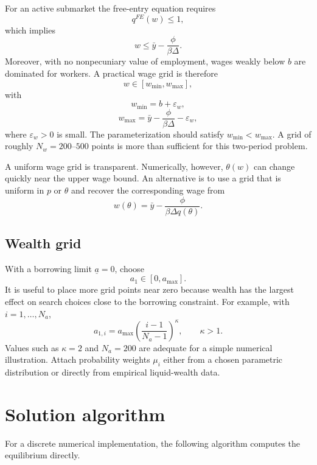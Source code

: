 \documentclass[11pt]{article}
\newcommand{\1}{\mathbf{1}}
\begin{document}
For an active submarket the free-entry equation requires
\[
q^{FE}(w)\leq 1,
\]
which implies
\[
w\leq \bar y-\frac{\phi}{\beta\Delta}.
\]
Moreover, with no nonpecuniary value of employment, wages weakly below $b$ are dominated for workers. A practical wage grid is therefore
\[
w\in[w_{\min},w_{\max}],
\]
with
\[
w_{\min}=b+\varepsilon_w,
\]
\[
w_{\max}=\bar y-\frac{\phi}{\beta\Delta}-\varepsilon_w,
\]
where $\varepsilon_w>0$ is small. The parameterization should satisfy $w_{\min}<w_{\max}$. A grid of roughly $N_w=200$--$500$ points is more than sufficient for this two-period problem.

A uniform wage grid is transparent. Numerically, however, $\theta(w)$ can change quickly near the upper wage bound. An alternative is to use a grid that is uniform in $p$ or $\theta$ and recover the corresponding wage from
\[
w(\theta)=\bar y-\frac{\phi}{\beta\Delta q(\theta)}.
\]

\subsection*{Wealth grid}

With a borrowing limit $\underline a=0$, choose
\[
a_1\in[0,a_{\max}].
\]
It is useful to place more grid points near zero because wealth has the largest effect on search choices close to the borrowing constraint. For example, with $i=1,\ldots,N_a$,
\[
a_{1,i}=a_{\max}\left(\frac{i-1}{N_a-1}\right)^\kappa,
\qquad \kappa>1.
\]
Values such as $\kappa=2$ and $N_a=200$ are adequate for a simple numerical illustration. Attach probability weights $\mu_i$ either from a chosen parametric distribution or directly from empirical liquid-wealth data.

\section{Solution algorithm}

For a discrete numerical implementation, the following algorithm computes the equilibrium directly.
\end{document}
